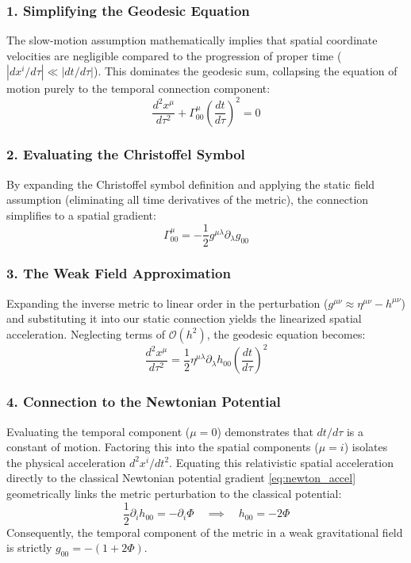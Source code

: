 \documentclass[11pt, a4paper]{report}
\begin{document}
\subsubsection*{1. Simplifying the Geodesic Equation}
The slow-motion assumption mathematically implies that spatial coordinate velocities are negligible compared to the progression of proper time ($|dx^{i}/d\tau| \ll |dt/d\tau|$). This dominates the geodesic sum, collapsing the equation of motion purely to the temporal connection component:
\begin{equation}
\label{eq:geodesic_slow}
\frac{d^{2}x^{\mu}}{d\tau^{2}} + \Gamma^{\mu}_{00}\left(\frac{dt}{d\tau}\right)^{2} = 0
\end{equation}

\subsubsection*{2. Evaluating the Christoffel Symbol}
By expanding the Christoffel symbol definition and applying the static field assumption (eliminating all time derivatives of the metric), the connection simplifies to a spatial gradient:
\begin{equation}
\label{eq:gamma_00_static}
\Gamma^{\mu}_{00} = -\frac{1}{2}g^{\mu\lambda}\partial_{\lambda}g_{00}
\end{equation}

\subsubsection*{3. The Weak Field Approximation}
Expanding the inverse metric to linear order in the perturbation ($g^{\mu\nu} \approx \eta^{\mu\nu} - h^{\mu\nu}$) and substituting it into our static connection yields the linearized spatial acceleration. Neglecting terms of $\mathcal{O}(h^2)$, the geodesic equation becomes:
\begin{equation}
\label{eq:geodesic_weak}
\frac{d^{2}x^{\mu}}{d\tau^{2}} = \frac{1}{2}\eta^{\mu\lambda}\partial_{\lambda}h_{00}\left(\frac{dt}{d\tau}\right)^{2}
\end{equation}

\subsubsection*{4. Connection to the Newtonian Potential}
Evaluating the temporal component ($\mu = 0$) demonstrates that $dt/d\tau$ is a constant of motion. Factoring this into the spatial components ($\mu = i$) isolates the physical acceleration $d^{2}x^{i}/dt^{2}$. Equating this relativistic spatial acceleration directly to the classical Newtonian potential gradient \eqref{eq:newton_accel} geometrically links the metric perturbation to the classical potential:
\begin{equation}
\label{eq:h00_phi}
\frac{1}{2}\partial_{i}h_{00} = -\partial_{i}\Phi \quad \implies \quad h_{00} = -2\Phi
\end{equation}
Consequently, the temporal component of the metric in a weak gravitational field is strictly $g_{00} = -(1 + 2\Phi)$.
\end{document}
